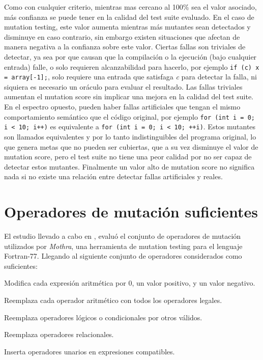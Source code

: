 Como con cualquier criterio, mientras mas cercano al 100\% sea el valor asociado, m\'as confianza se puede tener en la calidad del test suite evaluado. En el caso de mutation testing, este valor aumenta mientras m\'as mutantes sean detectados y disminuye en caso contrario, sin embargo existen situaciones que afectan de manera negativa a la confianza sobre este valor. Ciertas fallas son triviales de detectar, ya sea por que causan que la compilaci\'on o la ejecuci\'on (bajo cualquier entrada) falle, o solo requieren alcanzabilidad para hacerlo, por ejemplo \lstinline|if (c) x = array[-1];|, solo requiere una entrada que satisfaga \emph{c} para detectar la falla, ni siquiera es necesario un or\'aculo para evaluar el resultado. Las fallas triviales aumentan el mutation score sin implicar una mejora en la calidad del test suite. En el espectro opuesto, pueden haber fallas artificiales que tengan el mismo comportamiento sem\'antico que el c\'odigo original, por ejemplo \lstinline|for (int i = 0; i < 10; i++)| es equivalente a \lstinline|for (int i = 0; i < 10; ++i)|. Estos mutantes son llamados equivalentes y por lo tanto indistinguibles del programa original, lo que genera metas que no pueden ser cubiertas, que a su vez disminuye el valor de mutation score, pero el test suite no tiene una peor calidad por no ser capaz de detectar estos mutantes. Finalmente un valor alto de mutation score no significa nada si no existe una relaci\'on entre detectar fallas artificiales y reales.

\section{Operadores de mutaci\'on suficientes}
\label{sec:preliminares.mutation.sufficient}

El estudio llevado a cabo en \cite{bibliography.mutation.selection.Offutt96}, evalu\'o el conjunto de operadores de mutaci\'on utilizados por \emph{Mothra}, una herramienta de mutation testing para el lenguaje Fortran-77. Llegando al siguiente conjunto de operadores considerados como suficientes:

\begin{description}[leftmargin=8em,style=nextline]
	\item[ABS] Modifica cada expresi\'on aritm\'etica por 0, un valor positivo, y un valor negativo.
	\item[AOR] Reemplaza cada operador aritm\'etico con todos los operadores legales.
	\item[LCR] Reemplaza operadores l\'ogicos o condicionales por otros v\'alidos.
	\item[ROR] Reemplaza operadores relacionales.
	\item[UOI] Inserta operadores unarios en expresiones compatibles.
\end{description}

